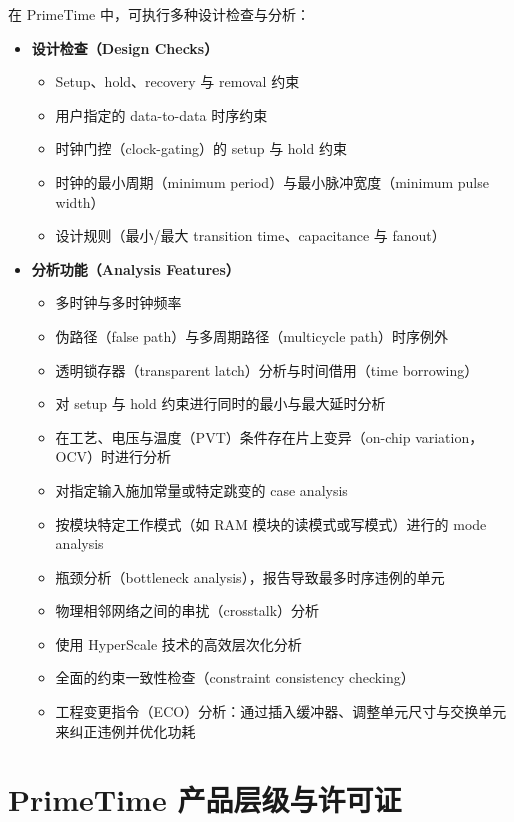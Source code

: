 在 PrimeTime 中，可执行多种设计检查与分析：
\begin{itemize}
  \item \textbf{设计检查（Design Checks）}
  \begin{itemize}
    \item Setup、hold、recovery 与 removal 约束
    \item 用户指定的 data-to-data 时序约束
    \item 时钟门控（clock-gating）的 setup 与 hold 约束
    \item 时钟的最小周期（minimum period）与最小脉冲宽度（minimum pulse width）
    \item 设计规则（最小/最大 transition time、capacitance 与 fanout）
  \end{itemize}
  \item \textbf{分析功能（Analysis Features）}
  \begin{itemize}
    \item 多时钟与多时钟频率
    \item 伪路径（false path）与多周期路径（multicycle path）时序例外
    \item 透明锁存器（transparent latch）分析与时间借用（time borrowing）
    \item 对 setup 与 hold 约束进行同时的最小与最大延时分析
    \item 在工艺、电压与温度（PVT）条件存在片上变异（on-chip variation，OCV）时进行分析
    \item 对指定输入施加常量或特定跳变的 case analysis
    \item 按模块特定工作模式（如 RAM 模块的读模式或写模式）进行的 mode analysis
    \item 瓶颈分析（bottleneck analysis），报告导致最多时序违例的单元
    \item 物理相邻网络之间的串扰（crosstalk）分析
    \item 使用 HyperScale 技术的高效层次化分析
    \item 全面的约束一致性检查（constraint consistency checking）
    \item 工程变更指令（ECO）分析：通过插入缓冲器、调整单元尺寸与交换单元来纠正违例并优化功耗
  \end{itemize}
\end{itemize}

\section{PrimeTime 产品层级与许可证}
